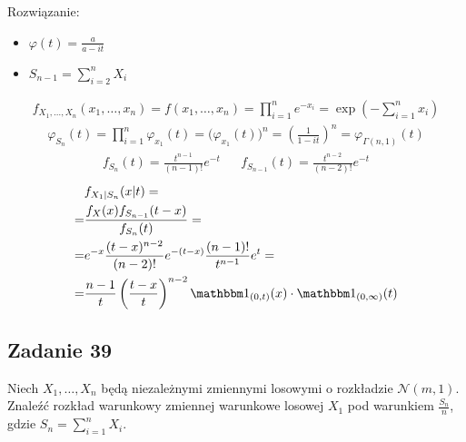Rozwiązanie:
\begin{itemize}
\item $ \varphi(t)=\frac{a}{a-it} $
\item $ S_{n-1}=\sum_{i=2}^{n}X_i $
\end{itemize}
\begin{gather*}
f_{X_1,\dots,X_n}( x_1,\dots,x_n)
=
f(x_1,\dots,x_n)
=
\prod_{i=1}^{n}e^{-x_i}
=
\exp\left(-\sum_{i=1}^{n}x_i\right)
\end{gather*}
\begin{align*}
\varphi_{S_n}(t)
=
\prod_{i=1}^{n}\varphi_{x_1}(t)
=
\bigl(\varphi_{x_1}(t)\bigr)^n
=
\left(\frac{1}{1-it}\right)^n
=
\varphi_{\Gamma(n,1)}(t)
\end{align*}
\begin{align*}
f_{S_n}(t)=\frac{t^{n-1}}{(n-1)!}e^{-t}
&&
f_{S_{n-1}}(t)=\frac{t^{n-2}}{(n-2)!}e^{-t}
\end{align*}
\begin{align*}
&f_{X_1|S_n}(x|t)
=\\=&
\frac{f_{X}(x)f_{S_{n-1}}(t-x)}{f_{S_n}(t)}
=\\=&
e^{-x}\frac{(t-x)^{n-2}}{(n-2)!}e^{-(t-x)}
\frac{(n-1)!}{t^{n-1}}e^{t}
=\\=&
\frac{n-1}{t}\left(\frac{t-x}{t}\right)^{n-2}\mathbbm1_{(0,t)}(x)\cdot\mathbbm1_{(0,\infty )}(t)
\end{align*}


\subsection*{Zadanie 39}
Niech $ X_1,\dots,X_n$ będą niezależnymi zmiennymi losowymi o rozkładzie $ \mathcal N(m,1)$. Znaleźć rozkład warunkowy zmiennej warunkowe losowej $ X_1 $ pod warunkiem $ \frac{S_n}{n} $, gdzie $ S_n=\sum_{i=1}^{n}X_i $.

